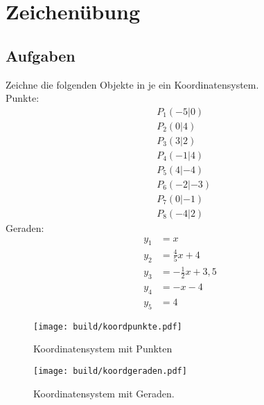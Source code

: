 


    \section*{Zeichenübung}
    \subsection*{Aufgaben}
    Zeichne die folgenden Objekte in je ein Koordinatensystem.\\
    Punkte:
    \begin{align}
        &P_1(-5|0)\\
        &P_2(0|4)\\
        &P_3(3|2)\\
        &P_4(-1|4)\\
        &P_5(4|-4)\\
        &P_6(-2|-3)\\
        &P_7(0|-1)\\
        &P_8(-4|2)
    \end{align}
    Geraden:
    \begin{align}
        y_1&=x\\
        y_2&=\frac{4}{5}x+4\\
        y_3&=-\frac{1}{2}x+3,5\\
        y_4&=-x-4\\
        y_5&=4
    \end{align}
    \begin{figure}
        \centering
        \texttt{[image: build/koordpunkte.pdf]}
        \caption{Koordinatensystem mit Punkten}
    \end{figure}
    \begin{figure}
        \centering
        \texttt{[image: build/koordgeraden.pdf]}
        \caption{Koordinatensystem mit Geraden.}
    \end{figure}

